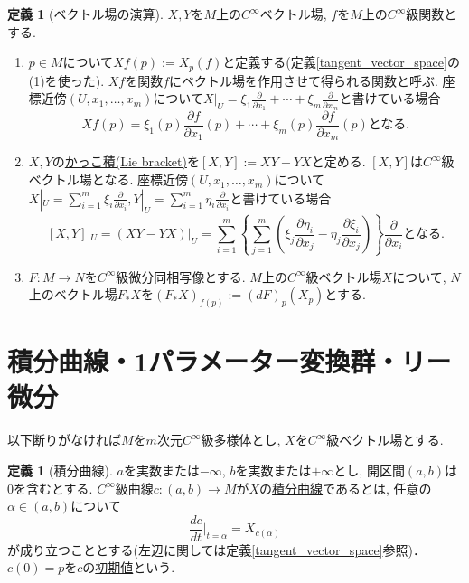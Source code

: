 \documentclass[dvipdfmx,a4paper,11pt]{article}
\theoremstyle{definition}
\newtheorem{dfn}[thm]{定義}
\newcommand{\pdrv}[2]{\frac{\partial #1}{\partial #2}}
\newcommand{\drv}[2]{\frac{d #1}{d#2}}
\begin{document}
    \begin{tcolorbox}[
    colback = white,
    colframe = green!35!black,
    fonttitle = \bfseries,
    breakable = true]
    \begin{dfn}[ベクトル場の演算]
    $X,Y$を$M$上の$C^{\infty}$ベクトル場, $f$を$M$上の$C^{\infty}$級関数とする. 
    \begin{enumerate}
        \setlength{\parskip}{0cm}
  \setlength{\itemsep}{2pt} 
    \item $p \in M$について$Xf(p) := X_{p} (f)$と定義する(定義\ref{tangent_vector_space}の(1)を使った). $Xf$を関数$f$にベクトル場を作用させて得られる関数と呼ぶ. 
    座標近傍$(U, x_1, \ldots, x_m)$について$X|_{U} = \xi_1 \pdrv{}{x_1} + \cdots +\xi_m \pdrv{}{x_m}$と書けている場合
    $$
    Xf(p) =  \xi_1(p) \pdrv{f}{x_1}(p) + \cdots +\xi_m(p) \pdrv{f}{x_m}(p) \text{となる.}
    $$
    \item $X,Y$の\underline{かっこ積(Lie bracket)}を$[X,Y]:= XY -YX$と定める. $[X,Y]$は$C^{\infty}$級ベクトル場となる. 座標近傍$(U, x_1, \ldots, x_m)$について$X|_{U} = \sum_{i=1}^{m}\xi_i \pdrv{}{x_i}, Y|_{U} = \sum_{i=1}^{m}\eta_i \pdrv{}{x_i}$と書けている場合
    $$
        [X, Y]|_{U} = (XY-YX)|_{U} =  
    \sum_{i=1}^{m} \left\{ \sum_{j=1}^{m} \left(  \xi_j\pdrv{\eta_i}{x_j} -  \eta_j\pdrv{\xi_i}{x_j} \right) \right\}\pdrv{}{x_i}
    \text{となる.}
    $$
    \item $F: M \rightarrow N$を$C^{\infty}$級微分同相写像とする. $M$上の$C^{\infty}$級ベクトル場$X$について, $N$上のベクトル場$F_{*}X$を$
    (F_{*}X)_{f(p)} := (dF)_{p}(X_{p}) \text{とする.}
    $
    \end{enumerate}
    \end{dfn}
    \end{tcolorbox}

\section{積分曲線・1パラメーター変換群・リー微分}
以下断りがなければ$M$を$m$次元$C^\infty$級多様体とし, $X$を$C^{\infty}$級ベクトル場とする. 
    \begin{tcolorbox}[
    colback = white,
    colframe = green!35!black,
    fonttitle = \bfseries,
    breakable = true]
    \begin{dfn}[積分曲線]
    
 $a$を実数または$- \infty$, $b$を実数または$+\infty$とし, 開区間$(a,b)$は$0$を含むとする.
 $C^{\infty}$級曲線$c : (a,b) \rightarrow M$が$X$の\underline{積分曲線}であるとは, 任意の$\alpha \in (a,b)$について
    $$
    \drv{c}{t}\Bigr|_{t=\alpha} =X_{c(\alpha)}
    $$
    が成り立つこととする(左辺に関しては定義\ref{tangent_vector_space}参照)．
    $c(0)=p$を$c$の\underline{初期値}という.
   
    \end{dfn}
    \end{tcolorbox}
 
\end{document}

